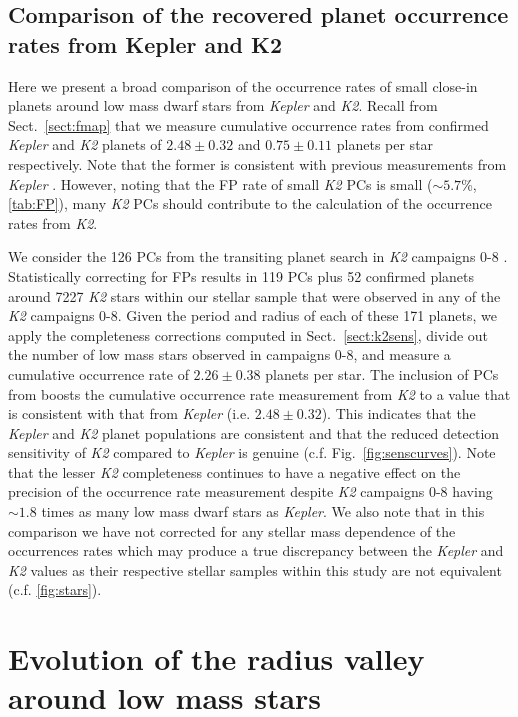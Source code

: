 \documentclass[twocolumn]{emulateapj}
\newcommand{\kepler}[1]{\emph{Kepler}#1}
\newcommand{\ktwo}[1]{\emph{K2}#1}
\begin{document}
\subsection{Comparison of the recovered planet occurrence rates from Kepler and K2} \label{sect:comparef}
Here we present a broad comparison of the occurrence rates of small close-in planets around
low mass dwarf stars from \kepler{} and \ktwo{.} Recall from Sect.~\ref{sect:fmap} that
we measure cumulative occurrence rates from confirmed \kepler{} and \ktwo{} planets of 
$2.48\pm 0.32$ and $0.75\pm 0.11$ planets per star respectively. Note that the former is consistent with
previous measurements from \kepler{} \citep{morton14,dressing15a,gaidos16}. However, noting that 
the FP rate of small \ktwo{} PCs is small ($\sim 5.7$\%, \autoref{tab:FP}), many \ktwo{} PCs should contribute
to the calculation of the occurrence rates from \ktwo{.}


We consider the 126 PCs from the transiting planet search in \ktwo{} campaigns 0-8 \citep{kruse19}.
Statistically correcting
for FPs results in 119 PCs plus 52 confirmed planets around 7227 \ktwo{} stars within our stellar sample that
were observed in any of the \ktwo{} campaigns 0-8. Given the period and radius of each of these 171 planets,
we apply the completeness corrections computed in Sect.~\ref{sect:k2sens}, divide out the number of low mass stars
observed in campaigns 0-8, and measure a cumulative occurrence rate of $2.26\pm 0.38$ planets per star. The inclusion
of PCs from \cite{kruse19} boosts the cumulative occurrence rate measurement from \ktwo{} to a value that is
consistent with that from \kepler{} (i.e. $2.48\pm 0.32$). This indicates that the \kepler{} and
\ktwo{} planet populations are consistent and that the reduced detection sensitivity of \ktwo{} compared to
\kepler{} is genuine (c.f. Fig.~\ref{fig:senscurves}). Note that the lesser \ktwo{} completeness continues to
have a negative
effect on the precision of the occurrence rate measurement despite \ktwo{} campaigns 0-8 having $\sim 1.8$ times
as many low mass dwarf stars as \kepler{.} We also note that in this comparison we have not corrected for any stellar
mass dependence of the occurrences rates which may produce a true discrepancy between the \kepler{} and \ktwo{}
values as their respective stellar samples within this study are not equivalent (c.f. \autoref{fig:stars}).  

\section{Evolution of the radius valley around low mass stars} \label{sect:models}
\end{document}
